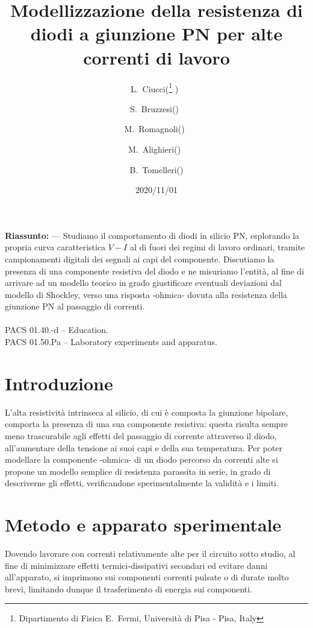 \documentclass{article}[a4paper, oneside, 11pt]
\title{Modellizzazione della resistenza di diodi a giunzione PN per alte correnti di lavoro}
\author{L.~Ciucci(\thanks{Dipartimento di Fisica E.~Fermi, Universit\`a di Pisa - Pisa, Italy} )~\and S.~Bruzzesi(\protect\footnotemark[1] )~\and M.~Romagnoli(\protect\footnotemark[1] )~\and M.~Alighieri(\protect\footnotemark[1] )~\and B.~Tomelleri(\protect\footnotemark[1] )}
\date{2020/11/01}
\begin{document}
\maketitle

\begin{mdframed}
\textbf{Riassunto:} --- Studiamo il comportamento di diodi in silicio PN,
esplorando la propria curva caratteristica $V - I$ al di fuori dei regimi di
lavoro ordinari, tramite campionamenti digitali dei segnali ai capi del
componente. Discutiamo la presenza di una componente resistiva del diodo e ne
misuriamo l'entità, al fine di arrivare ad un modello teorico in grado
giustificare eventuali deviazioni dal modello di Shockley, verso una risposta
-ohmica- dovuta alla resistenza della giunzione PN al passaggio di correnti.\\\\
PACS 01.40.-d – Education.\\
PACS 01.50.Pa – Laboratory experiments and apparatus.
\end{mdframed}

\section{Introduzione}
L'alta resistività intrinseca al silicio, di cui è composta la giunzione
bipolare, comporta la presenza di una sua componente resistiva: questa 
risulta sempre meno trascurabile agli effetti del passaggio di corrente
attraverso il diodo, all'aumentare della tensione ai suoi capi e della sua 
temperatura. Per poter modellare la componente -ohmica- di un diodo
percorso da correnti alte si propone un modello semplice di resistenza
parassita in serie, in grado di descriverne gli effetti, verificandone 
sperimentalmente la validità e i limiti. 
\section{Metodo e apparato sperimentale}
Dovendo lavorare con correnti relativamente alte per il circuito sotto studio,
al fine di minimizzare effetti termici-dissipativi secondari ed evitare danni
all'apparato, si imprimono sui componenti correnti pulsate o di durate molto
brevi, limitando dunque il trasferimento di energia sui componenti.
\end{document}
